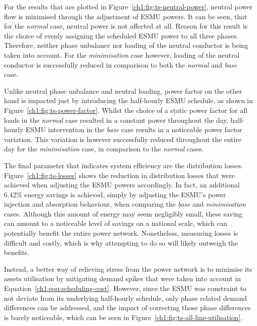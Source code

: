 For the results that are plotted in Figure~\ref{ch1:fig:ts-neutral-power}, neutral power flow is minimised through the adjustment of ESMU powers.
It can be seen, that for the \textit{normal} case, neutral power is not affected at all.
Reason for this result is the choice of evenly assigning the scheduled ESMU power to all three phases.
Therefore, neither phase unbalance nor loading of the neutral conductor is being taken into account.
For the \textit{minimisation} case however, loading of the neutral conductor is successfully reduced in comparison to both the \textit{normal} and \textit{base} case.



Unlike neutral phase unbalance and neutral loading, power factor on the other hand is impacted just by introducing the half-hourly ESMU schedule, as shown in Figure~\ref{ch1:fig:ts-power-factor}.
Whilst the choice of a static power factor for all loads in the \textit{normal} case resulted in a constant power throughout the day, half-hourly ESMU intervention in the \textit{base} case results in a noticeable power factor variation.
This variation is however successfully reduced throughout the entire day for the \textit{minimisation} case, in comparison to the \textit{normal} cases.



The final parameter that indicates system efficiency are the distribution losses.
Figure~\ref{ch1:fig:ts-losses} shows the reduction in distribution losses that were achieved when adjusting the ESMU powers accordingly.
In fact, an additional 6.42\% energy savings is achieved, simply by adjusting the ESMU's power injection and absorption behaviour, when comparing the \textit{base} and \textit{minimisation} cases.
Although this amount of energy may seem negligibly small, these saving can amount to a noticeable level of savings on a national scale, which can potentially benefit the entire power network.
Nonetheless, measuring losses is difficult and costly, which is why attempting to do so will likely outweigh the benefits.

Instead, a better way of relieving stress from the power network is to minimise its assets utilisation by mitigating demand spikes that were taken into account in Equation~\ref{ch1:equ:scheduling-cost}.
However, since the ESMU was constraint to not deviate from its underlying half-hourly schedule, only phase related demand differences can be addressed, and the impact of correcting those phase differences is barely noticeable, which can be seen in Figure~\ref{ch1:fig:ts-all-line-utilisation}.

